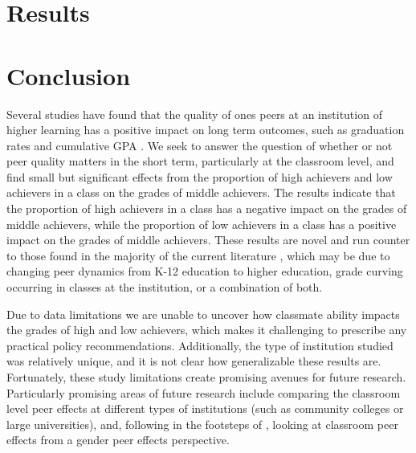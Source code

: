 \documentclass[12pt,letterpaper,english,fleqn]{article}
\begin{document}


\section{Results}\label{results}



\section{Conclusion}\label{conclusion}


Several studies have found that the quality of ones peers at an institution of higher learning has a positive impact on long term outcomes, such as graduation rates and cumulative GPA \citep{smith2015new,luppino2015college,ost2010role}.
We seek to answer the question of whether or not peer quality matters in the short term, particularly at the classroom level, and find small but significant effects from the proportion of high achievers and low achievers in a class on the grades of middle achievers. 
The results indicate that the proportion of high achievers in a class has a negative impact on the grades of middle achievers, while the proportion of low achievers in a class has a positive impact on the grades of middle achievers. 
These results are novel and run counter to those found in the majority of the current literature \citep{kang2007classroom,carman2012classroom,burke2013classroom,schlosser2008inside,lavy2012good}, which may be due to changing peer dynamics from K-12 education to higher education, grade curving occurring in classes at the institution, or a combination of both.
 
Due to data limitations we are unable to uncover how classmate ability impacts the grades of high and low achievers, which makes it challenging to prescribe any practical policy recommendations.
Additionally, the type of institution studied was relatively unique, and it is not clear how generalizable these results are. 
Fortunately, these study limitations create promising avenues for future research.
Particularly promising areas of future research include comparing the classroom level peer effects at different types of institutions (such as community colleges or large universities), and, following in the footsteps of \citet{oosterbeek2014gender}, looking at classroom peer effects from a gender peer effects perspective.
       
\newpage{}

\pagestyle{plain}
\singlespacing
{}


\clearpage{}

\pagestyle{fancy}
\begin{appendices}



\end{appendices}
\end{document}
